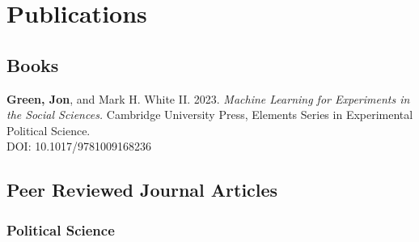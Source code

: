 \documentclass[letterpaper]{article}
\begin{document}
\section*{Publications}

\subsection*{Books}
\begin{etaremune}
\item  \textbf{Green, Jon}, and Mark H. White II. 2023. \textit{Machine Learning for Experiments in the Social Sciences.} Cambridge University Press, Elements Series in Experimental Political Science.\\
DOI: 10.1017/9781009168236
\end{etaremune}

\subsection*{Peer Reviewed Journal Articles}

\subsubsection*{Political Science}
\end{document}
